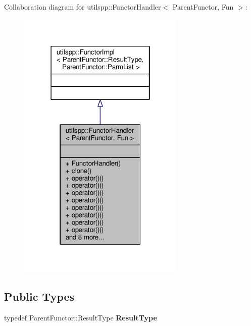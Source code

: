 Collaboration diagram for utilspp\-:\-:Functor\-Handler$<$ Parent\-Functor, Fun $>$\-:\nopagebreak
\begin{figure}[H]
\begin{center}
\leavevmode
\includegraphics[width=226pt]{classutilspp_1_1FunctorHandler__coll__graph}
\end{center}
\end{figure}
\subsection*{Public Types}
\begin{DoxyCompactItemize}
\item 
\hypertarget{classutilspp_1_1FunctorHandler_ac1582c39cb3d20184679a1b17039fb8a}{typedef Parent\-Functor\-::\-Result\-Type {\bfseries Result\-Type}}\label{classutilspp_1_1FunctorHandler_ac1582c39cb3d20184679a1b17039fb8a}

\end{DoxyCompactItemize}
